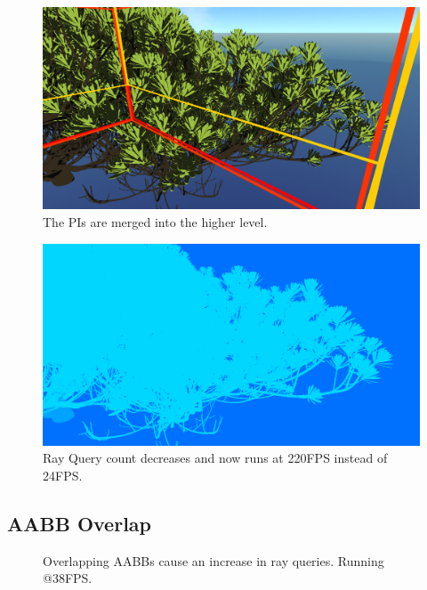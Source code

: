 \begin{figure}
    \centering
    \includegraphics[width=.8\textwidth]{images/showcase/InstanceListAABB.PNG}
    \caption{The PIs are merged into the higher level.}
    \label{fig:instanceListAABB}
\end{figure}

\begin{figure}
    \centering
    \includegraphics[width=.8\textwidth]{images/showcase/InstanceListAABBQuery220FPS.PNG}
    \caption{Ray Query count decreases and now runs at 220FPS instead of 24FPS.}
    \label{fig:instanceListQueryCount}
\end{figure}

\newpage
\subsection{AABB Overlap}
\label{sec:OptInstanceOverlap}

\begin{figure}
    \hfill
    \hfill
    \hfill
    \caption{Overlapping AABBs cause an increase in ray queries. Running @38FPS.}
    \label{fig:beachUnmerged}
\end{figure}

